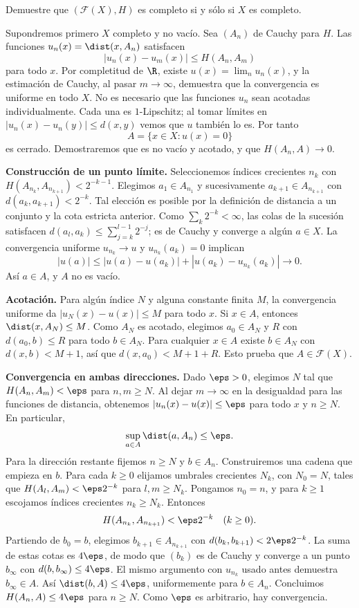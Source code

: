 \begin{ejercicio}\label{ch11:hiper-completo}
Demuestre que $(\mathcal F(X),H)$ es completo si y sólo si $X$ es completo.
\end{ejercicio}
\begin{solucion}
Supondremos primero $X$ completo y no vacío. Sea $(A_n)$ de Cauchy para $H$. Las funciones $u_n(x)=\dist(x,A_n)$ satisfacen
\[
 |u_n(x)-u_m(x)|\leq H(A_n,A_m)
\]
para todo $x$. Por completitud de $\R$, existe $u(x)=\lim_nu_n(x)$, y la estimación de Cauchy, al pasar $m\to\infty$, demuestra que la convergencia es uniforme en todo $X$. No es necesario que las funciones $u_n$ sean acotadas individualmente. Cada una es $1$-Lipschitz; al tomar límites en $|u_n(x)-u_n(y)|\leq d(x,y)$ vemos que $u$ también lo es. Por tanto
\[
 A=\{x\in X:u(x)=0\}
\]
es cerrado. Demostraremos que es no vacío y acotado, y que $H(A_n,A)\to0$.

\textbf{Construcción de un punto límite.} Seleccionemos índices crecientes $n_k$ con $H(A_{n_k},A_{n_{k+1}})<2^{-k-1}$. Elegimos $a_1\in A_{n_1}$ y sucesivamente $a_{k+1}\in A_{n_{k+1}}$ con $d(a_k,a_{k+1})<2^{-k}$. Tal elección es posible por la definición de distancia a un conjunto y la cota estricta anterior. Como $\sum_k2^{-k}<\infty$, las colas de la sucesión satisfacen $d(a_l,a_k)\leq\sum_{j=k}^{l-1}2^{-j}$; es de Cauchy y converge a algún $a\in X$. La convergencia uniforme $u_{n_k}\to u$ y $u_{n_k}(a_k)=0$ implican
\[
 |u(a)|\leq |u(a)-u(a_k)|+|u(a_k)-u_{n_k}(a_k)|\longrightarrow0.
\]
Así $a\in A$, y $A$ no es vacío.

\textbf{Acotación.} Para algún índice $N$ y alguna constante finita $M$, la convergencia uniforme da $|u_N(x)-u(x)|\leq M$ para todo $x$. Si $x\in A$, entonces $\dist(x,A_N)\leq M$. Como $A_N$ es acotado, elegimos $a_0\in A_N$ y $R$ con $d(a_0,b)\leq R$ para todo $b\in A_N$. Para cualquier $x\in A$ existe $b\in A_N$ con $d(x,b)<M+1$, así que $d(x,a_0)<M+1+R$. Esto prueba que $A\in\mathcal F(X)$.

\textbf{Convergencia en ambas direcciones.} Dado $\eps>0$, elegimos $N$ tal que $H(A_n,A_m)<\eps$ para $n,m\geq N$. Al dejar $m\to\infty$ en la desigualdad para las funciones de distancia, obtenemos $|u_n(x)-u(x)|\leq\eps$ para todo $x$ y $n\geq N$. En particular,
\[
 \sup_{a\in A}\dist(a,A_n)\leq\eps.
\]
Para la dirección restante fijemos $n\geq N$ y $b\in A_n$. Construiremos una cadena que empieza en $b$. Para cada $k\geq0$ elijamos umbrales crecientes $N_k$, con $N_0=N$, tales que $H(A_l,A_m)<\eps2^{-k}$ para $l,m\geq N_k$. Pongamos $n_0=n$, y para $k\geq1$ escojamos índices crecientes $n_k\geq N_k$. Entonces
\[
 H(A_{n_k},A_{n_{k+1}})<\eps2^{-k}\quad(k\geq0).
\]
Partiendo de $b_0=b$, elegimos $b_{k+1}\in A_{n_{k+1}}$ con $d(b_k,b_{k+1})<2\eps2^{-k}$. La suma de estas cotas es $4\eps$, de modo que $(b_k)$ es de Cauchy y converge a un punto $b_\infty$ con $d(b,b_\infty)\leq4\eps$. El mismo argumento con $u_{n_k}$ usado antes demuestra $b_\infty\in A$. Así $\dist(b,A)\leq4\eps$, uniformemente para $b\in A_n$. Concluimos $H(A_n,A)\leq4\eps$ para $n\geq N$. Como $\eps$ es arbitrario, hay convergencia.


\end{solucion}
